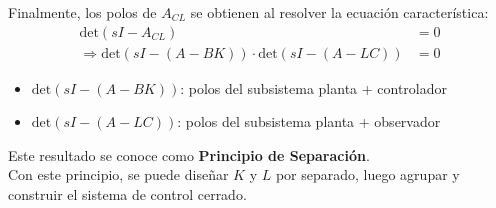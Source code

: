 Finalmente, los polos de $A_{CL}$ se obtienen al resolver la ecuación característica:
\begin{align*}
    \text{det}(sI-A_{CL})&=0\\
    \Longrightarrow \text{det}(sI-(A-BK))\cdot\text{det}(sI-(A-LC)) &=0
\end{align*}

\begin{itemize}
    \item $\text{det}(sI-(A-BK))$: polos del subsistema planta + controlador
    \item $\text{det}(sI-(A-LC))$: polos del subsistema planta + observador 
\end{itemize}

Este resultado se conoce como \textbf{Principio de Separación}.\\

Con este principio, se puede diseñar $K$ y $L$ por separado, luego agrupar y construir el sistema de control cerrado.

